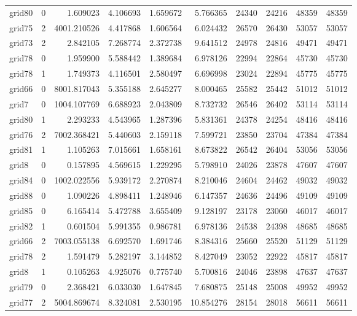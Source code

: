 \begin{longtable}{|l|r|r|r|r|r|r|r|r|r|}
grid80 & 0 & 1.609023 & 4.106693 & 1.659672 & 5.766365 & 24340 & 24216 & 48359 & 48359 \\
grid75 & 2 & 4001.210526 & 4.417868 & 1.606564 & 6.024432 & 26570 & 26430 & 53057 & 53057 \\
grid73 & 2 & 2.842105 & 7.268774 & 2.372738 & 9.641512 & 24978 & 24816 & 49471 & 49471 \\
grid78 & 0 & 1.959900 & 5.588442 & 1.389684 & 6.978126 & 22994 & 22864 & 45730 & 45730 \\
grid78 & 1 & 1.749373 & 4.116501 & 2.580497 & 6.696998 & 23024 & 22894 & 45775 & 45775 \\
grid66 & 0 & 8001.817043 & 5.355188 & 2.645277 & 8.000465 & 25582 & 25442 & 51012 & 51012 \\
grid7 & 0 & 1004.107769 & 6.688923 & 2.043809 & 8.732732 & 26546 & 26402 & 53114 & 53114 \\
grid80 & 1 & 2.293233 & 4.543965 & 1.287396 & 5.831361 & 24378 & 24254 & 48416 & 48416 \\
grid76 & 2 & 7002.368421 & 5.440603 & 2.159118 & 7.599721 & 23850 & 23704 & 47384 & 47384 \\
grid81 & 1 & 1.105263 & 7.015661 & 1.658161 & 8.673822 & 26542 & 26404 & 53056 & 53056 \\
grid8 & 0 & 0.157895 & 4.569615 & 1.229295 & 5.798910 & 24026 & 23878 & 47607 & 47607 \\
grid84 & 0 & 1002.022556 & 5.939172 & 2.270874 & 8.210046 & 24604 & 24462 & 49032 & 49032 \\
grid88 & 0 & 1.090226 & 4.898411 & 1.248946 & 6.147357 & 24636 & 24496 & 49109 & 49109 \\
grid85 & 0 & 6.165414 & 5.472788 & 3.655409 & 9.128197 & 23178 & 23060 & 46017 & 46017 \\
grid82 & 1 & 0.601504 & 5.991355 & 0.986781 & 6.978136 & 24538 & 24398 & 48685 & 48685 \\
grid66 & 2 & 7003.055138 & 6.692570 & 1.691746 & 8.384316 & 25660 & 25520 & 51129 & 51129 \\
grid78 & 2 & 1.591479 & 5.282197 & 3.144852 & 8.427049 & 23052 & 22922 & 45817 & 45817 \\
grid8 & 1 & 0.105263 & 4.925076 & 0.775740 & 5.700816 & 24046 & 23898 & 47637 & 47637 \\
grid79 & 0 & 2.368421 & 6.033030 & 1.647845 & 7.680875 & 25148 & 25008 & 49952 & 49952 \\
grid77 & 2 & 5004.869674 & 8.324081 & 2.530195 & 10.854276 & 28154 & 28018 & 56611 & 56611 \\

\end{longtable}
